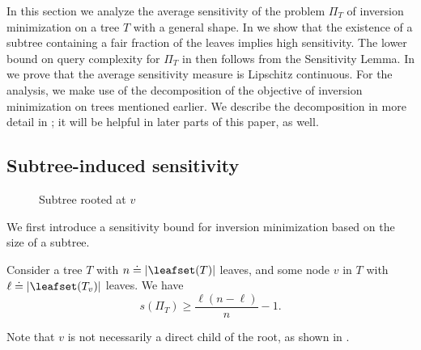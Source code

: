 \documentclass{toc}
\begin{document}
In this section we analyze the average sensitivity of the problem $\Pi_T$ of inversion minimization on a tree $T$ with a general shape. In  we show that the existence of a subtree containing a fair fraction of the leaves implies high sensitivity. The lower bound on query complexity for $\Pi_T$ in  then follows from the Sensitivity Lemma. In  we prove that the average sensitivity measure is Lipschitz continuous. For the analysis, we make use of the decomposition of the objective of inversion minimization on trees mentioned earlier. We describe the decomposition in more detail in ; it will be helpful in later parts of this paper, as well. 

\subsection{Subtree-induced sensitivity}
\label{sec:sensitivity:subtree}

\begin{figure}
    \centering
    \caption{Subtree rooted at $v$}
    \label{fig:k-ary:subtree}
\end{figure}

We first introduce a sensitivity bound for inversion minimization based on the size of a subtree. 

\begin{lemma}
    \label{lemma:k-ary:subtree-sensitivity}
    Consider a tree $T$ with $n \doteq \lvert\leafset(T)\rvert$ leaves, and some node $v$ in $T$ with $\ell \doteq \lvert\leafset(T_v)\rvert$ leaves. We have
    \[s(\Pi_T) \ge \frac{\ell(n-\ell)}{n}-1. \]
\end{lemma}
Note that $v$ is not necessarily a direct child of the root, as shown in .
\end{document}
